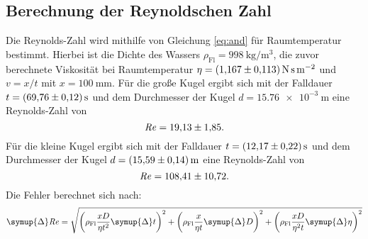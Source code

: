 \subsection{Berechnung der Reynoldschen Zahl}
Die Reynolds-Zahl wird mithilfe von Gleichung \eqref{eq:and} für Raumtemperatur bestimmt.
Hierbei ist die Dichte des Wassers
\mbox{$\rho_\text{Fl} = \SI[per-mode=reciprocal]{998}{\kg\per\meter\cubed}$},
die zuvor berechnete Viskosität bei Raumtemperatur
\mbox{$\eta = \SI[per-mode=reciprocal]{1.167\pm0.113}{\newton\second\per\meter\squared}$} und
$v=x/t$ mit $x=\SI{100}{\milli\meter}$.
Für die große Kugel ergibt sich mit der Falldauer
\mbox{$t = \SI[per-mode=reciprocal]{69.76\pm0.12}{\second}$} und
dem Durchmesser der Kugel
\mbox{$d = \SI[per-mode=reciprocal]{15.76e-3}{\meter}$}
eine Reynolds-Zahl von
\begin{equation}
    \mathit{R\kern-.04em e} = \num{19.13\pm1.85}.
\end{equation}
%
Für die kleine Kugel ergibt sich mit
der Falldauer
\mbox{$t = \SI[per-mode=reciprocal]{12.17\pm0.22}{\second}$} und
dem Durchmesser der Kugel
\mbox{$d = \SI[per-mode=reciprocal]{15.59\pm0.14}{\meter}$}
eine Reynolds-Zahl von
\begin{equation}
    \mathit{R\kern-.04em e} = \num{108.41\pm10.72}.
\end{equation}
%
Die Fehler berechnet sich nach:
\begin{equation}
    \symup{\Delta}\mathit{R\kern-.04em e} = \sqrt{
        \left(\rho_\text{Fl} \frac{xD}{\eta t^2}\symup{\Delta}t \right)^2 +
        \left(\rho_\text{Fl} \frac{x}{\eta t}\symup{\Delta}D \right)^2 +
        \left(\rho_\text{Fl} \frac{xD}{\eta^2 t}\symup{\Delta}\eta \right)^2
    }
\end{equation}
